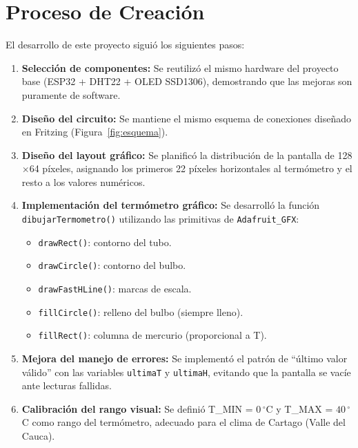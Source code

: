 \documentclass[12pt,a4paper]{article}
\begin{document}
\section{Proceso de Creación}

El desarrollo de este proyecto siguió los siguientes pasos:

\begin{enumerate}
    \item \textbf{Selección de componentes:} Se reutilizó el mismo hardware del proyecto base (ESP32 + DHT22 + OLED SSD1306), demostrando que las mejoras son puramente de software.
    
    \item \textbf{Diseño del circuito:} Se mantiene el mismo esquema de conexiones diseñado en Fritzing (Figura~\ref{fig:esquema}).
    
    \item \textbf{Diseño del layout gráfico:} Se planificó la distribución de la pantalla de 128$\times$64 píxeles, asignando los primeros 22 píxeles horizontales al termómetro y el resto a los valores numéricos.
    
    \item \textbf{Implementación del termómetro gráfico:} Se desarrolló la función \texttt{dibujarTermometro()} utilizando las primitivas de \texttt{Adafruit\_GFX}:
    \begin{itemize}
        \item \texttt{drawRect()}: contorno del tubo.
        \item \texttt{drawCircle()}: contorno del bulbo.
        \item \texttt{drawFastHLine()}: marcas de escala.
        \item \texttt{fillCircle()}: relleno del bulbo (siempre lleno).
        \item \texttt{fillRect()}: columna de mercurio (proporcional a T).
    \end{itemize}
    
    \item \textbf{Mejora del manejo de errores:} Se implementó el patrón de ``último valor válido'' con las variables \texttt{ultimaT} y \texttt{ultimaH}, evitando que la pantalla se vacíe ante lecturas fallidas.
    
    \item \textbf{Calibración del rango visual:} Se definió T\_MIN = $0\,^\circ$C y T\_MAX = $40\,^\circ$C como rango del termómetro, adecuado para el clima de Cartago (Valle del Cauca).
    

\end{enumerate}
\end{document}
